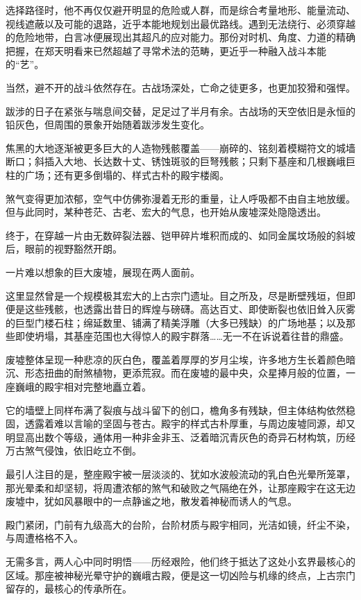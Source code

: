 选择路径时，他不再仅仅避开明显的危险或人群，而是综合考量地形、能量流动、视线遮蔽以及可能的退路，近乎本能地规划出最优路线。遇到无法绕行、必须穿越的危险地带，白言冰便展现出其超凡的应对能力。那份对时机、角度、力道的精确把握，在郑天明看来已然超越了寻常术法的范畴，更近乎一种融入战斗本能的“艺”。

当然，避不开的战斗依然存在。古战场深处，亡命之徒更多，也更加狡猾和强悍。

\vspace{2em}

跋涉的日子在紧张与喘息间交替，足足过了半月有余。古战场的天空依旧是永恒的铅灰色，但周围的景象开始随着跋涉发生变化。

焦黑的大地逐渐被更多巨大的人造物残骸覆盖——崩碎的、铭刻着模糊符文的城墙断口；斜插入大地、长达数十丈、锈蚀斑驳的巨弩残骸；只剩下基座和几根巍峨巨柱的广场；还有更多倒塌的、样式古朴的殿宇楼阁。

煞气变得更加浓郁，空气中仿佛弥漫着无形的重量，让人呼吸都不由自主地放缓。但与此同时，某种苍茫、古老、宏大的气息，也开始从废墟深处隐隐透出。

终于，在穿越一片由无数碎裂法器、铠甲碎片堆积而成的、如同金属坟场般的斜坡后，眼前的视野豁然开朗。

一片难以想象的巨大废墟，展现在两人面前。

这里显然曾是一个规模极其宏大的上古宗门遗址。目之所及，尽是断壁残垣，但即便是这些残骸，也透露出昔日的辉煌与磅礴。高达百丈、即使断裂也依旧耸入灰雾的巨型门楼石柱；绵延数里、铺满了精美浮雕（大多已残缺）的广场地基；以及那些即使坍塌，其基座范围也大得惊人的殿宇群落……无一不在诉说着往昔的鼎盛。

废墟整体呈现一种悲凉的灰白色，覆盖着厚厚的岁月尘埃，许多地方生长着颜色暗沉、形态扭曲的耐煞植物，更添荒寂。而在废墟的最中央，众星捧月般的位置，一座巍峨的殿宇相对完整地矗立着。

它的墙壁上同样布满了裂痕与战斗留下的创口，檐角多有残缺，但主体结构依然稳固，透露着难以言喻的坚固与苍古。殿宇的样式古朴厚重，与周边废墟同源，却又明显高出数个等级，通体用一种非金非玉、泛着暗沉青灰色的奇异石材构筑，历经万古煞气侵蚀，依旧屹立不倒。

最引人注目的是，整座殿宇被一层淡淡的、犹如水波般流动的乳白色光晕所笼罩，那光晕柔和却坚韧，将周遭浓郁的煞气和破败之气隔绝在外，让那座殿宇在这无边废墟中，犹如风暴眼中的一点静谧之地，散发着神秘而诱人的气息。

殿门紧闭，门前有九级高大的台阶，台阶材质与殿宇相同，光洁如镜，纤尘不染，与周遭格格不入。

无需多言，两人心中同时明悟——历经艰险，他们终于抵达了这处小玄界最核心的区域。那座被神秘光晕守护的巍峨古殿，便是这一切凶险与机缘的终点，上古宗门留存的，最核心的传承所在。

